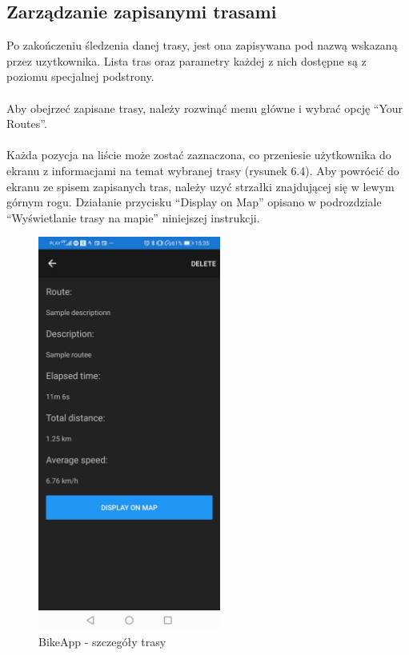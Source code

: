 \subsection{Zarządzanie zapisanymi trasami} %
Po zakończeniu śledzenia danej trasy, jest ona zapisywana pod nazwą wskazaną przez uzytkownika. Lista tras oraz parametry każdej z nich dostępne są z poziomu specjalnej podstrony.\\
\\
Aby obejrzeć zapisane trasy, należy rozwinąć menu główne i wybrać opcję ``Your Routes''.\\
\\
Każda pozycja na liście może zostać zaznaczona, co przeniesie użytkownika do ekranu z informacjami na temat wybranej trasy (rysunek 6.4). Aby powrócić do ekranu ze spisem zapisanych tras, należy uzyć strzałki znajdującej się w lewym górnym rogu. Działanie przycisku ``Display on Map'' opisano w podrozdziale ``Wyświetlanie trasy na mapie'' niniejszej instrukcji.

\begin{figure}[!htb]
	\begin{center}
		\includegraphics[width=6cm]{rys/instructions-route-details.jpg}
		\caption{BikeApp - szczegóły trasy}
		\label{rys:BikeApp - szczegóły trasy}
	\end{center}
\end{figure}

